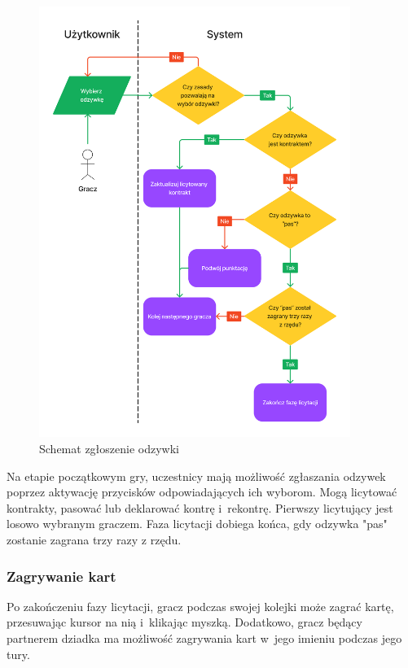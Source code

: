 \begin{figure}[hbt!]
  \centering
  \includegraphics[width=0.9\textwidth]{img/schematy/bid.png}
  \caption{Schemat zgłoszenie odzywki}
\end{figure}

Na etapie początkowym gry, uczestnicy mają możliwość zgłaszania odzywek poprzez
aktywację przycisków odpowiadających ich wyborom. Mogą licytować kontrakty, pasować lub
deklarować kontrę i~rekontrę. Pierwszy licytujący jest losowo
wybranym graczem. Faza licytacji dobiega końca, gdy odzywka "pas" zostanie zagrana
trzy razy z rzędu.


\FloatBarrier


\subsubsection{Zagrywanie kart}

Po zakończeniu fazy licytacji, gracz podczas swojej kolejki może zagrać kartę,
przesuwając kursor na nią i~klikając myszką. Dodatkowo, gracz będący partnerem dziadka
ma możliwość zagrywania kart w~jego imieniu podczas jego tury.


